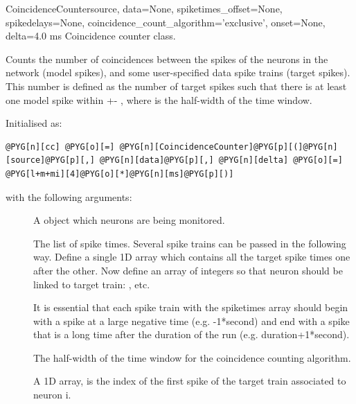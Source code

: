 \documentclass[letterpaper,10pt,english]{manual}
\begin{document}
\hypertarget{brian.CoincidenceCounter}{}\begin{classdesc}{CoincidenceCounter}{source, data=None, spiketimes\_offset=None, spikedelays=None, coincidence\_count\_algorithm='exclusive', onset=None, delta=4.0 ms}
Coincidence counter class.

Counts the number of coincidences between the spikes of the neurons in the network (model spikes),
and some user-specified data spike trains (target spikes). This number is defined as the number of 
target spikes such that there is at least one model spike within +- , where 
is the half-width of the time window.

Initialised as:

\begin{Verbatim}[commandchars=@\[\]]
@PYG[n][cc] @PYG[o][=] @PYG[n][CoincidenceCounter]@PYG[p][(]@PYG[n][source]@PYG[p][,] @PYG[n][data]@PYG[p][,] @PYG[n][delta] @PYG[o][=] @PYG[l+m+mi][4]@PYG[o][*]@PYG[n][ms]@PYG[p][)]
\end{Verbatim}

with the following arguments:
\begin{description}
\item[] \leavevmode
A \hyperlink{brian.NeuronGroup}{} object which neurons are being monitored.

\item[] \leavevmode
The list of spike times. Several spike trains can be passed in the following way.
Define a single 1D array  which contains all the target spike times one after the
other. Now define an array  of integers so that neuron  should 
be linked to target train: , etc.

It is essential that each spike train with the spiketimes array should begin with a spike at a
large negative time (e.g. -1*second) and end with a spike that is a long time
after the duration of the run (e.g. duration+1*second).

\item[] \leavevmode
The half-width of the time window for the coincidence counting algorithm.

\item[] \leavevmode
A 1D array,  is the index of the first spike of 
the target train associated to neuron i.


\end{description}
\end{classdesc}
\end{document}
